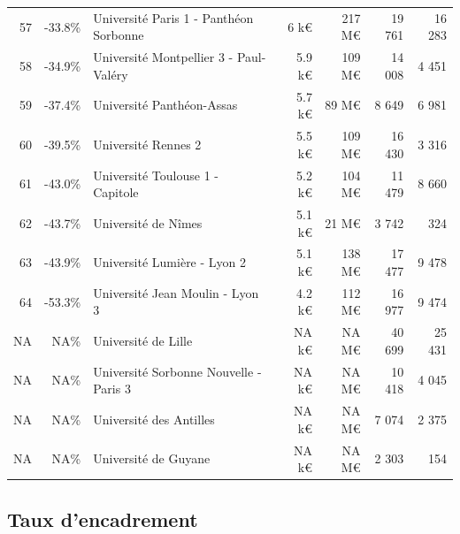 \documentclass[12pt,french,]{article}
\begin{document}
\begin{longtable}{rrlrrrr}
\rowcolor{gray!6}  57 & -33.8\% & Université Paris 1 - Panthéon Sorbonne & 6 k€ & 217 M€ & 19 761 & 16 283\\
58 & -34.9\% & Université Montpellier 3 - Paul-Valéry & 5.9 k€ & 109 M€ & 14 008 & 4 451\\
\rowcolor{gray!6}  59 & -37.4\% & Université Panthéon-Assas & 5.7 k€ & 89 M€ & 8 649 & 6 981\\
60 & -39.5\% & Université Rennes 2 & 5.5 k€ & 109 M€ & 16 430 & 3 316\\
\addlinespace
\rowcolor{gray!6}  61 & -43.0\% & Université Toulouse 1 - Capitole & 5.2 k€ & 104 M€ & 11 479 & 8 660\\
62 & -43.7\% & Université de Nîmes & 5.1 k€ & 21 M€ & 3 742 & 324\\
\rowcolor{gray!6}  63 & -43.9\% & Université Lumière - Lyon 2 & 5.1 k€ & 138 M€ & 17 477 & 9 478\\
64 & -53.3\% & Université Jean Moulin - Lyon 3 & 4.2 k€ & 112 M€ & 16 977 & 9 474\\
\rowcolor{gray!6}  NA & NA\% & Université de Lille & NA k€ & NA M€ & 40 699 & 25 431\\
\addlinespace
NA & NA\% & Université Sorbonne Nouvelle - Paris 3 & NA k€ & NA M€ & 10 418 & 4 045\\
\rowcolor{gray!6}  NA & NA\% & Université des Antilles & NA k€ & NA M€ & 7 074 & 2 375\\
NA & NA\% & Université de Guyane & NA k€ & NA M€ & 2 303 & 154\\*
\end{longtable}

\newpage

\hypertarget{taux-dencadrement}{%
\subsection{Taux d'encadrement}\label{taux-dencadrement}}
\end{document}
